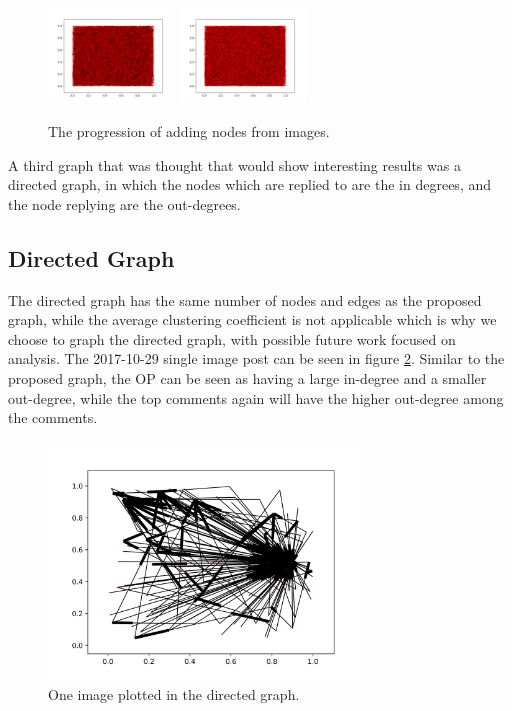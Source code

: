 \documentclass{article}
\begin{document}
\begin{figure}[h!]
    \includegraphics[width=0.3\textwidth]{NormalImgurGraphNoOp40.png}
    \includegraphics[width=0.3\textwidth]{NormalImgurGraphNoOp45.png}
    \caption{The progression of adding nodes from images.}
    \label{545postNoOp}
\end{figure}

\par A third graph that was thought that would show interesting results was a directed graph, in which the nodes which are replied to are the in degrees, and the node replying are the out-degrees. 

\subsection{Directed Graph}
\par The directed graph has the same number of nodes and edges as the proposed graph, while the average clustering coefficient is not applicable which is why we choose to graph the directed graph, with possible future work focused on analysis. The 2017-10-29 single image post can be seen in figure \ref{post1Directed}. Similar to the proposed graph, the OP can be seen as having a large in-degree and a smaller out-degree, while the top comments again will have the higher out-degree among the comments. 

\begin{figure}[h!]
    \centering
    \includegraphics[width=0.75\textwidth]{DirectedImgurGraph1.png}
    \caption{One image plotted in the directed graph.}
    \label{post1Directed}
\end{figure}
\end{document}
